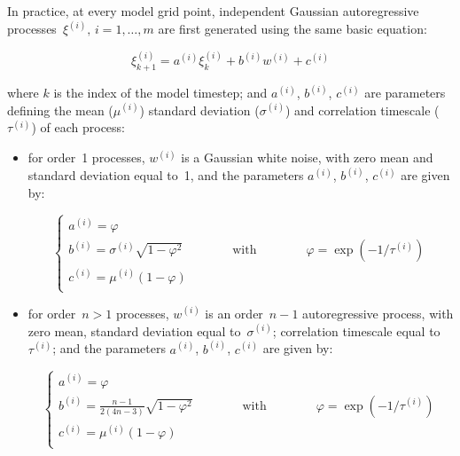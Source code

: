 \documentclass[NEMO_book]{subfiles}
\begin{document}
In practice, at every model grid point, independent Gaussian autoregressive
processes~$\xi^{(i)},\,i=1,\ldots,m$ are first generated
using the same basic equation:

\begin{equation}
\label{eq:autoreg}
\xi^{(i)}_{k+1} = a^{(i)} \xi^{(i)}_k + b^{(i)} w^{(i)} + c^{(i)}
\end{equation}

\noindent
where $k$ is the index of the model timestep; and
$a^{(i)}$, $b^{(i)}$, $c^{(i)}$ are parameters defining
the mean ($\mu^{(i)}$) standard deviation ($\sigma^{(i)}$)
and correlation timescale ($\tau^{(i)}$) of each process:

\begin{itemize}
\item for order~1 processes, $w^{(i)}$ is a Gaussian white noise,
with zero mean and standard deviation equal to~1, and the parameters
$a^{(i)}$, $b^{(i)}$, $c^{(i)}$ are given by:

\begin{equation}
\label{eq:ord1}
\left\{
\begin{array}{l}
a^{(i)} = \varphi \\
b^{(i)} = \sigma^{(i)} \sqrt{ 1 - \varphi^2 } 
 \qquad\qquad\mbox{with}\qquad\qquad
\varphi = \exp \left( - 1 / \tau^{(i)} \right) \\
c^{(i)} = \mu^{(i)} \left( 1 - \varphi \right) \\
\end{array}
\right.
\end{equation}

\item for order~$n>1$ processes, $w^{(i)}$ is an order~$n-1$ autoregressive process,
with zero mean, standard deviation equal to~$\sigma^{(i)}$; correlation timescale
equal to~$\tau^{(i)}$; and the parameters
$a^{(i)}$, $b^{(i)}$, $c^{(i)}$ are given by:

\begin{equation}
\label{eq:ord2}
\left\{
\begin{array}{l}
a^{(i)} = \varphi \\
b^{(i)} = \frac{n-1}{2(4n-3)} \sqrt{ 1 - \varphi^2 } 
 \qquad\qquad\mbox{with}\qquad\qquad
\varphi = \exp \left( - 1 / \tau^{(i)} \right) \\
c^{(i)} = \mu^{(i)} \left( 1 - \varphi \right) \\
\end{array}
\right.
\end{equation}

\end{itemize}
\end{document}
